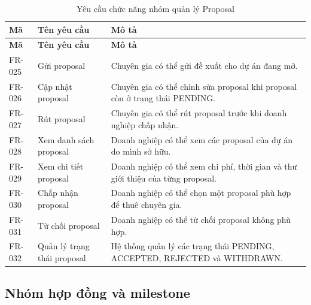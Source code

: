 \begin{longtable}{|p{2.0cm}|p{4.2cm}|p{7.6cm}|}
\caption{Yêu cầu chức năng nhóm quản lý Proposal}
\label{tab:fr-proposal} \\ \hline
\textbf{Mã} & \textbf{Tên yêu cầu} & \textbf{Mô tả} \\ \hline
\endfirsthead
\hline
\textbf{Mã} & \textbf{Tên yêu cầu} & \textbf{Mô tả} \\ \hline
\endhead

FR-025 & Gửi proposal & Chuyên gia có thể gửi đề xuất cho dự án đang mở. \\ \hline
FR-026 & Cập nhật proposal & Chuyên gia có thể chỉnh sửa proposal khi proposal còn ở trạng thái PENDING. \\ \hline
FR-027 & Rút proposal & Chuyên gia có thể rút proposal trước khi doanh nghiệp chấp nhận. \\ \hline
FR-028 & Xem danh sách proposal & Doanh nghiệp có thể xem các proposal của dự án do mình sở hữu. \\ \hline
FR-029 & Xem chi tiết proposal & Doanh nghiệp có thể xem chi phí, thời gian và thư giới thiệu của từng proposal. \\ \hline
FR-030 & Chấp nhận proposal & Doanh nghiệp có thể chọn một proposal phù hợp để thuê chuyên gia. \\ \hline
FR-031 & Từ chối proposal & Doanh nghiệp có thể từ chối proposal không phù hợp. \\ \hline
FR-032 & Quản lý trạng thái proposal & Hệ thống quản lý các trạng thái PENDING, ACCEPTED, REJECTED và WITHDRAWN. \\ \hline
\end{longtable}

\subsection{Nhóm hợp đồng và milestone}

